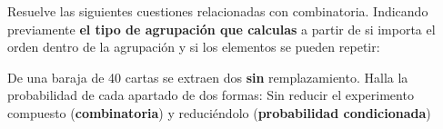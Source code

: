 \documentclass[addpoints,spanish, 12pt,a4paper]{exam}
\begin{document}
\begin{questions}

\question Resuelve las siguientes cuestiones relacionadas con combinatoria. Indicando previamente \textbf{el tipo de agrupación que calculas} a partir de si importa el orden dentro de la agrupación y si los elementos se pueden repetir:

\question De una baraja de 40 cartas se extraen dos \textbf{sin} remplazamiento. Halla la probabilidad de cada apartado de dos formas: Sin reducir el experimento compuesto (\textbf{combinatoria}) y reduciéndolo (\textbf{probabilidad condicionada})

\begin{parts}

\end{parts}
\end{questions}
\end{document}
